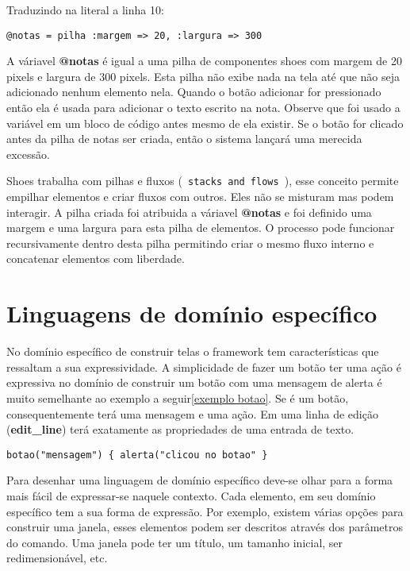 \documentclass[12pt]{article}
\begin{document}
 

Traduzindo na literal a linha 10:

\begin{lstlisting}[caption=Entendendo a pilha de componentes]
  @notas = pilha :margem => 20, :largura => 300
\end{lstlisting}

A váriavel \textbf{@notas} é igual a uma pilha de componentes shoes com margem de 20 pixels e largura de 300 pixels. Esta pilha não exibe nada na tela até que não seja adicionado nenhum elemento nela. Quando o botão adicionar for pressionado então ela é usada para adicionar o texto escrito na nota. Observe que foi usado a variável em um bloco de código antes mesmo de ela existir. Se o botão for clicado antes da pilha de notas ser criada, então o sistema lançará uma merecida excessão. 

Shoes trabalha com pilhas e fluxos (\texttt{ stacks and flows }), esse conceito permite empilhar elementos e criar fluxos com outros. Eles não se misturam mas podem interagir. A pilha criada foi atribuida a váriavel \textbf{ @notas } e foi definido uma margem e uma largura para esta pilha de elementos. O processo pode funcionar recursivamente dentro desta pilha permitindo criar o mesmo fluxo interno e concatenar elementos com liberdade.

\section { Linguagens de domínio específico }

No domínio específico de construir telas o framework tem características que ressaltam a sua expressividade. A simplicidade de fazer um botão ter uma ação é expressiva no domínio de construir um botão com uma mensagem de alerta é muito semelhante ao exemplo a seguir\ref{exemplo botao}. Se é um botão, consequentemente terá uma mensagem e uma ação.  Em uma linha de edição (\textbf{edit\_line}) terá exatamente as propriedades de uma entrada de texto. 


\begin{lstlisting}[label=exemplo botao, caption=Simplicidade do botão]
botao("mensagem") { alerta("clicou no botao" } 
\end{lstlisting}


Para desenhar uma linguagem de domínio específico deve-se olhar para a forma mais fácil de expressar-se naquele contexto.
Cada elemento, em seu domínio específico tem a sua forma de expressão. Por exemplo,  existem várias opções para construir uma janela, esses elementos podem ser descritos através dos parâmetros do comando. Uma janela pode ter um título, um tamanho inicial, ser redimensionável, etc.
\end{document}
